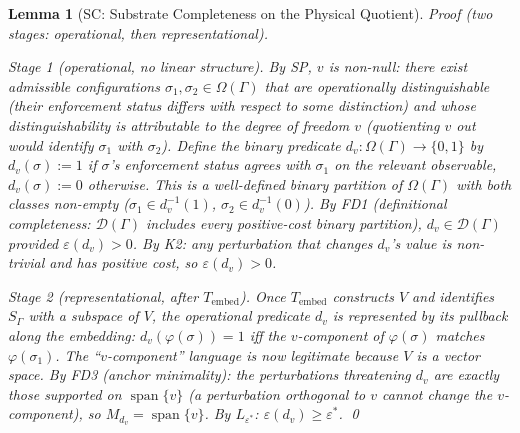 \documentclass[11pt,a4paper]{article}
\newtheorem{lemma}[theorem]{Lemma}
\theoremstyle{definition}
\newcommand{\eps}{\varepsilon}
\DeclareMathOperator{\spn}{span}
\begin{document}
\begin{lemma}[SC: Substrate Completeness on the Physical Quotient]
\noindent\textit{Proof} (two stages: operational, then representational).

\textit{Stage 1 (operational, no linear structure).}  By SP, $v$ is non-null: there exist admissible configurations $\sigma_1, \sigma_2 \in \Omega(\Gamma)$ that are operationally distinguishable (their enforcement status differs with respect to some distinction) and whose distinguishability is attributable to the degree of freedom $v$ (quotienting $v$ out would identify $\sigma_1$ with $\sigma_2$).  Define the binary predicate $d_v: \Omega(\Gamma) \to \{0,1\}$ by $d_v(\sigma) := 1$ if $\sigma$'s enforcement status agrees with $\sigma_1$ on the relevant observable, $d_v(\sigma) := 0$ otherwise.  This is a well-defined binary partition of $\Omega(\Gamma)$ with both classes non-empty ($\sigma_1 \in d_v^{-1}(1)$, $\sigma_2 \in d_v^{-1}(0)$).  By FD1 (definitional completeness: $\mathcal{D}(\Gamma)$ includes every positive-cost binary partition), $d_v \in \mathcal{D}(\Gamma)$ provided $\eps(d_v) > 0$.  By K2: any perturbation that changes $d_v$'s value is non-trivial and has positive cost, so $\eps(d_v) > 0$.

\textit{Stage 2 (representational, after $T_{\mathrm{embed}}$).}  Once $T_{\mathrm{embed}}$ constructs $V$ and identifies $S_\Gamma$ with a subspace of $V$, the operational predicate $d_v$ is represented by its pullback along the embedding: $d_v(\varphi(\sigma)) = 1$ iff the $v$-component of $\varphi(\sigma)$ matches $\varphi(\sigma_1)$.  The ``$v$-component'' language is now legitimate because $V$ is a vector space.  By FD3 (anchor minimality): the perturbations threatening $d_v$ are exactly those supported on $\spn\{v\}$ (a perturbation orthogonal to $v$ cannot change the $v$-component), so $M_{d_v} = \spn\{v\}$.  By $L_{\eps^*}$: $\eps(d_v) \ge \eps^*$.  \qed


\end{lemma}
\end{document}
